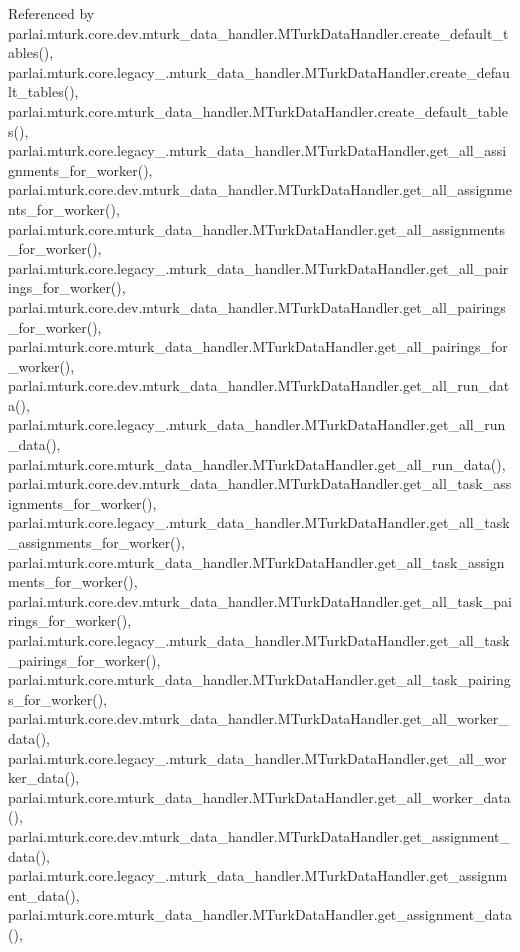 Referenced by parlai.\+mturk.\+core.\+dev.\+mturk\+\_\+data\+\_\+handler.\+M\+Turk\+Data\+Handler.\+create\+\_\+default\+\_\+tables(), parlai.\+mturk.\+core.\+legacy\+\_.\+mturk\+\_\+data\+\_\+handler.\+M\+Turk\+Data\+Handler.\+create\+\_\+default\+\_\+tables(), parlai.\+mturk.\+core.\+mturk\+\_\+data\+\_\+handler.\+M\+Turk\+Data\+Handler.\+create\+\_\+default\+\_\+tables(), parlai.\+mturk.\+core.\+legacy\+\_.\+mturk\+\_\+data\+\_\+handler.\+M\+Turk\+Data\+Handler.\+get\+\_\+all\+\_\+assignments\+\_\+for\+\_\+worker(), parlai.\+mturk.\+core.\+dev.\+mturk\+\_\+data\+\_\+handler.\+M\+Turk\+Data\+Handler.\+get\+\_\+all\+\_\+assignments\+\_\+for\+\_\+worker(), parlai.\+mturk.\+core.\+mturk\+\_\+data\+\_\+handler.\+M\+Turk\+Data\+Handler.\+get\+\_\+all\+\_\+assignments\+\_\+for\+\_\+worker(), parlai.\+mturk.\+core.\+legacy\+\_.\+mturk\+\_\+data\+\_\+handler.\+M\+Turk\+Data\+Handler.\+get\+\_\+all\+\_\+pairings\+\_\+for\+\_\+worker(), parlai.\+mturk.\+core.\+dev.\+mturk\+\_\+data\+\_\+handler.\+M\+Turk\+Data\+Handler.\+get\+\_\+all\+\_\+pairings\+\_\+for\+\_\+worker(), parlai.\+mturk.\+core.\+mturk\+\_\+data\+\_\+handler.\+M\+Turk\+Data\+Handler.\+get\+\_\+all\+\_\+pairings\+\_\+for\+\_\+worker(), parlai.\+mturk.\+core.\+dev.\+mturk\+\_\+data\+\_\+handler.\+M\+Turk\+Data\+Handler.\+get\+\_\+all\+\_\+run\+\_\+data(), parlai.\+mturk.\+core.\+legacy\+\_.\+mturk\+\_\+data\+\_\+handler.\+M\+Turk\+Data\+Handler.\+get\+\_\+all\+\_\+run\+\_\+data(), parlai.\+mturk.\+core.\+mturk\+\_\+data\+\_\+handler.\+M\+Turk\+Data\+Handler.\+get\+\_\+all\+\_\+run\+\_\+data(), parlai.\+mturk.\+core.\+dev.\+mturk\+\_\+data\+\_\+handler.\+M\+Turk\+Data\+Handler.\+get\+\_\+all\+\_\+task\+\_\+assignments\+\_\+for\+\_\+worker(), parlai.\+mturk.\+core.\+legacy\+\_.\+mturk\+\_\+data\+\_\+handler.\+M\+Turk\+Data\+Handler.\+get\+\_\+all\+\_\+task\+\_\+assignments\+\_\+for\+\_\+worker(), parlai.\+mturk.\+core.\+mturk\+\_\+data\+\_\+handler.\+M\+Turk\+Data\+Handler.\+get\+\_\+all\+\_\+task\+\_\+assignments\+\_\+for\+\_\+worker(), parlai.\+mturk.\+core.\+dev.\+mturk\+\_\+data\+\_\+handler.\+M\+Turk\+Data\+Handler.\+get\+\_\+all\+\_\+task\+\_\+pairings\+\_\+for\+\_\+worker(), parlai.\+mturk.\+core.\+legacy\+\_.\+mturk\+\_\+data\+\_\+handler.\+M\+Turk\+Data\+Handler.\+get\+\_\+all\+\_\+task\+\_\+pairings\+\_\+for\+\_\+worker(), parlai.\+mturk.\+core.\+mturk\+\_\+data\+\_\+handler.\+M\+Turk\+Data\+Handler.\+get\+\_\+all\+\_\+task\+\_\+pairings\+\_\+for\+\_\+worker(), parlai.\+mturk.\+core.\+dev.\+mturk\+\_\+data\+\_\+handler.\+M\+Turk\+Data\+Handler.\+get\+\_\+all\+\_\+worker\+\_\+data(), parlai.\+mturk.\+core.\+legacy\+\_.\+mturk\+\_\+data\+\_\+handler.\+M\+Turk\+Data\+Handler.\+get\+\_\+all\+\_\+worker\+\_\+data(), parlai.\+mturk.\+core.\+mturk\+\_\+data\+\_\+handler.\+M\+Turk\+Data\+Handler.\+get\+\_\+all\+\_\+worker\+\_\+data(), parlai.\+mturk.\+core.\+dev.\+mturk\+\_\+data\+\_\+handler.\+M\+Turk\+Data\+Handler.\+get\+\_\+assignment\+\_\+data(), parlai.\+mturk.\+core.\+legacy\+\_.\+mturk\+\_\+data\+\_\+handler.\+M\+Turk\+Data\+Handler.\+get\+\_\+assignment\+\_\+data(), parlai.\+mturk.\+core.\+mturk\+\_\+data\+\_\+handler.\+M\+Turk\+Data\+Handler.\+get\+\_\+assignment\+\_\+data(), 